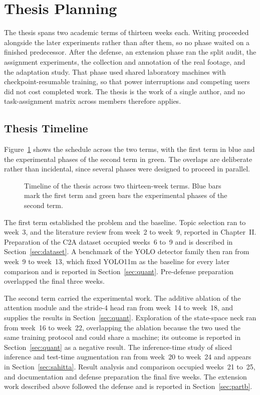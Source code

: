\section{Thesis Planning}
The thesis spans two academic terms of thirteen weeks each. Writing proceeded
alongside the later experiments rather than after them, so no phase waited on a
finished predecessor. After the defense, an extension phase ran the split audit,
the assignment experiments, the collection and annotation of the real footage,
and the adaptation study. That phase used shared laboratory machines with
checkpoint-resumable training, so that power interruptions and competing users
did not cost completed work. The thesis is the work of a single author, and no
task-assignment matrix across members therefore applies.

\subsection{Thesis Timeline}
Figure~\ref{fig:gantt} shows the schedule across the two terms, with the first
term in blue and the experimental phases of the second term in green. The
overlaps are deliberate rather than incidental, since several phases were
designed to proceed in parallel.

\begin{figure}[tbp]
  \centering
  \resizebox{\linewidth}{!}{}
  \caption[Timeline of the thesis across two thirteen-week terms.]{Timeline of
  the thesis across two thirteen-week terms. Blue bars mark the first term and
  green bars the experimental phases of the second term.}
  \label{fig:gantt}
\end{figure}

The first term established the problem and the baseline. Topic selection ran to
week~3, and the literature review from week~2 to week~9, reported in
Chapter~II. Preparation of the C2A dataset occupied weeks~6 to~9 and is
described in Section~\ref{sec:dataset}. A benchmark of the YOLO detector family
then ran from week~9 to week~13, which fixed YOLO11m as the baseline for every
later comparison and is reported in Section~\ref{sec:quant}. Pre-defense preparation overlapped
the final three weeks.

The second term carried the experimental work. The additive ablation of the
attention module and the stride-4 head ran from week~14 to week~18, and supplies
the results in Section~\ref{sec:quant}. Exploration of the state-space neck ran from week~16
to week~22, overlapping the ablation because the two used the same training
protocol and could share a machine; its outcome is reported in Section~\ref{sec:quant} as a
negative result. The inference-time study of sliced inference and test-time
augmentation ran from week~20 to week~24 and appears in
Section~\ref{sec:sahitta}. Result
analysis and comparison occupied weeks~21 to~25, and documentation and defense
preparation the final five weeks. The extension work described above followed
the defense and is reported in Section~\ref{sec:partb}.

